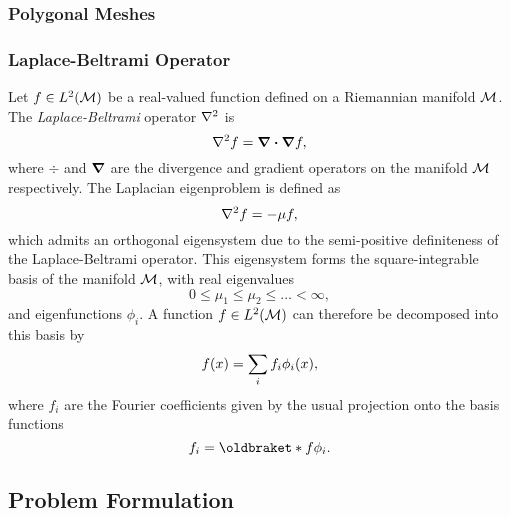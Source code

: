 \subsubsection{Polygonal Meshes}

\subsubsection{Laplace-Beltrami Operator}

Let \(f \in L^{2}(\mathcal{M})\) be a real-valued function defined on a Riemannian manifold \(\mathcal{M}{}\).
The \emph{Laplace-Beltrami} operator \(\laplacian{}\) is
%
\begin{equation}
	\laplacian f
	= \div{\grad{f}},
\end{equation}
%
where \(\div{}\) and \(\grad{}\) are the divergence and gradient operators on the manifold \(\mathcal{M}{}\) respectively.
The Laplacian eigenproblem is defined as
%
\begin{equation}
	\laplacian f
	= -\mu f,
\end{equation}
%
which admits an orthogonal eigensystem due to the semi-positive definiteness of the Laplace-Beltrami operator.
This eigensystem forms the square-integrable basis of the manifold \(\mathcal{M}{}\), with real eigenvalues
%
\begin{equation}
	0 \leq \mu_{1} \leq \mu_{2} \leq \ldots < \infty, %
\end{equation}
%
and eigenfunctions \(\phi_{i}\).
A function \(f \in L^{2}(\mathcal{M})\) can therefore be decomposed into this basis by
%
\begin{equation}
	f(x)
	= \sum\limits_{i} f_{i} \phi_{i}(x),
\end{equation}
%
where \(f_{i}\) are the Fourier coefficients given by the usual projection onto the basis functions
%
\begin{equation}
	f_{i}
	= \braket{f}{\phi_{i}}.
\end{equation}



\subsection{Problem Formulation}\label{sec:chapter4_problem_formulation}

